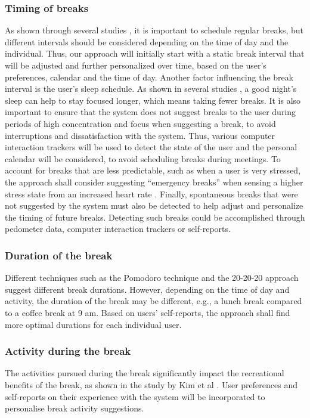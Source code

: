 \documentclass{hasel_thesis}
\begin{document}
\subsubsection{Timing of breaks}
As shown through several studies \cite{Largo-Wight.2017} \cite{KimS.ParkY.&Niu.2017}, it is important to schedule regular breaks, but different intervals should be considered depending on the time of day \cite{KimS.ParkY.&Niu.2017} and the individual. Thus, our approach will initially start with a static break interval that will be adjusted and further personalized over time, based on the user's preferences, calendar and the time of day. Another factor influencing the break interval is the user's sleep schedule. As shown in several studies \cite{Rosekind.2010} \cite{Gingerich.2017} \cite{Choi.2018}, a good night's sleep  can help to stay focused longer, which means taking fewer breaks. 
It is also important to ensure that the system does not suggest breaks to the user during periods of high concentration and focus when suggesting a break, to avoid interruptions and dissatisfaction with the system. Thus, various computer interaction trackers will be used to detect the state of the user and the personal calendar will be considered, to avoid scheduling breaks during meetings. 
To account for breaks that are less predictable, such as when a user is very stressed, the approach shall consider suggesting “emergency breaks” when sensing a higher stress state from an increased heart rate \cite{Hjortskov.2004}. 
Finally, spontaneous breaks that were not suggested by the system must also be detected to help adjust and personalize the timing of future breaks. Detecting such breaks could be accomplished through pedometer data, computer interaction trackers or self-reports. 

\subsubsection{Duration of the break}
Different techniques such as the Pomodoro technique and the 20-20-20 approach suggest different break durations. However, depending on the time of day and activity, the duration of the break may be different, e.g., a lunch break compared to a coffee break at 9 am. Based on users’ self-reports, the approach shall find more optimal durations for each individual user.  

\subsubsection{Activity during the break}
The activities pursued during the break significantly impact the recreational benefits of the break, as shown in the study by Kim et al \cite{KimS.ParkY.&Niu.2017}. User preferences and self-reports on their experience with the system will be incorporated to personalise break activity suggestions. 
\end{document}
